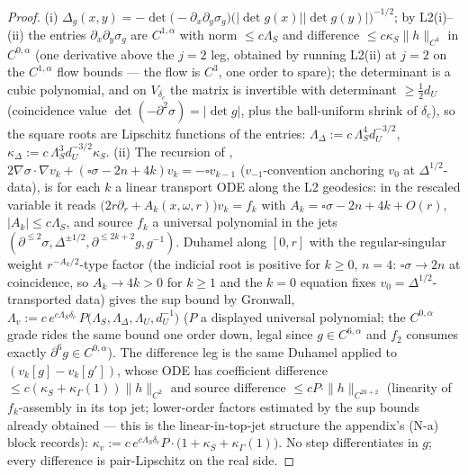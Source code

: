 \begin{proof}
(i) $\Delta_g(x,y)=-\det\bigl(-\partial_x\partial_y\sigma_g\bigr)
\bigl(|\det g(x)||\det g(y)|\bigr)^{-1/2}$; by L2(i)--(ii) the entries
$\partial_x\partial_y\sigma_g$ are $C^{1,\alpha}$ with norm
$\le c\Lambda_S$ and difference $\le c\kappa_S\|h\|_{C^{4}}$ in
$C^{0,\alpha}$ (one derivative above the $j=2$ leg, obtained by running
L2(ii) at $j=2$ on the $C^{1,\alpha}$ flow bounds --- the flow is $C^3$,
one order to spare); the determinant is a cubic polynomial, and on
$V_{\delta_c}$ the matrix is invertible with determinant
$\ge\tfrac12 d_U$ (coincidence value $\det(-\partial^2\sigma)=
|\det g|$, plus the ball-uniform shrink of $\delta_c$), so the square
roots are Lipschitz functions of the entries:
$\Lambda_\Delta:=c\,\Lambda_S^{4}d_U^{-3/2}$,
$\kappa_\Delta:=c\,\Lambda_S^{3}d_U^{-3/2}\kappa_S$.
(ii) The recursion of \cite[Thm.~2.1]{Moretti2003},
$2\nabla\sigma\!\cdot\!\nabla v_k+(\square\sigma-2n+4k)v_k
=-\square v_{k-1}$ ($v_{-1}$-convention anchoring
$v_0$ at $\Delta^{1/2}$-data), is for each $k$ a linear transport ODE
along the L2 geodesics: in the rescaled variable it reads
$\bigl(2r\partial_r+A_k(x,\omega,r)\bigr)v_k=f_k$ with
$A_k=\square\sigma-2n+4k+O(r)$, $|A_k|\le c\Lambda_S$, and source
$f_k$ a universal polynomial in the jets
$(\partial^{\le2}\sigma,\Delta^{\pm1/2},\partial^{\le2k+2}g,g^{-1})$.
Duhamel along $[0,r]$ with the regular-singular weight
$r^{-A_k/2}$-type factor (the indicial root is positive for
$k\ge0$, $n=4$: $\square\sigma\to2n$ at coincidence, so
$A_k\to4k>0$ for $k\ge1$ and the $k=0$ equation fixes
$v_0=\Delta^{1/2}$-transported data) gives the sup bound by Gronwall,
$\Lambda_v:=c\,e^{c\Lambda_S\delta_c}\,
P\bigl(\Lambda_S,\Lambda_\Delta,\Lambda_U,d_U^{-1}\bigr)$
($P$ a displayed universal polynomial; the $C^{0,\alpha}$ grade rides
the same bound one order down, legal since $g\in C^{6,\alpha}$ and
$f_2$ consumes exactly $\partial^{6}g\in C^{0,\alpha}$). The
difference leg is the same Duhamel applied to
$(v_k[g]-v_k[g'])$, whose ODE has coefficient difference
$\le c(\kappa_S+\kappa_\Gamma(1))\|h\|_{C^{2}}$ and source difference
$\le cP\cdot\|h\|_{C^{2k+2}}$ (linearity of $f_k$-assembly in its
top jet; lower-order factors estimated by the sup bounds already
obtained --- this is the linear-in-top-jet structure the appendix's
(N-a) block records):
$\kappa_v:=c\,e^{c\Lambda_S\delta_c}P\cdot
\bigl(1+\kappa_S+\kappa_\Gamma(1)\bigr)$. No step differentiates in
$g$; every difference is pair-Lipschitz on the real side.
\end{proof}


